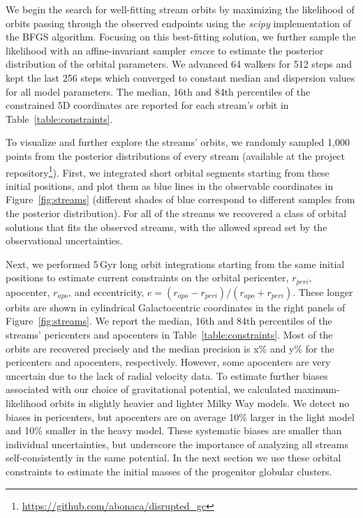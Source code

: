 \documentclass[twocolumn]{aastex63}
\newcommand{\package}[1]{\textsl{#1}}
\begin{document}
We begin the search for well-fitting stream orbits by maximizing the likelihood of orbits passing through the observed endpoints using the \package{scipy} implementation of the BFGS algorithm.
Focusing on this best-fitting solution, we further sample the likelihood with an affine-invariant sampler \package{emcee} to estimate the posterior distribution of the orbital parameters.
We advanced 64 walkers for 512 steps and kept the last 256 steps which converged to constant median and dispersion values for all model parameters.
The median, 16th and 84th percentiles of the constrained 5D coordinates are reported for each stream's orbit in Table~\ref{table:constraints}.

To visualize and further explore the streams' orbits, we randomly sampled 1,000 points from the posterior distributions of every stream (available at the project repository\footnote{\url{https://github.com/abonaca/disrupted_gc}}).
First, we integrated short orbital segments starting from these initial positions, and plot them as blue lines in the observable coordinates in Figure~\ref{fig:streams} (different shades of blue correspond to different samples from the posterior distribution).
For all of the streams we recovered a class of orbital solutions that fits the observed streams, with the allowed spread set by the observational uncertainties.

Next, we performed 5\,Gyr long orbit integrations starting from the same initial positions to estimate current constraints on the orbital pericenter, $r_{peri}$, apocenter, $r_{apo}$, and eccentricity, $e=(r_{apo} - r_{peri})/(r_{apo} + r_{peri})$.
These longer orbits are shown in cylindrical Galactocentric coordinates in the right panels of Figure~\ref{fig:streams}.
We report the median, 16th and 84th percentiles of the streams' pericenters and apocenters in Table~\ref{table:constraints}.
Most of the orbits are recovered precisely and the median precision is x\% and y\% for the pericenters and apocenters, respectively.
However, some apocenters are very uncertain due to the lack of radial velocity data.
To estimate further biases associated with our choice of gravitational potential, we calculated maximum-likelihood orbits in slightly heavier \citep[used in][]{pwb, bonaca:2019a} and lighter \citep{bovy:2015} Milky Way models.
We detect no biases in pericenters, but apocenters are on average 10\% larger in the light model and 10\% smaller in the heavy model.
These systematic biases are smaller than individual uncertainties, but underscore the importance of analyzing all streams self-consistently in the same potential.
In the next section we use these orbital constraints to estimate the initial masses of the progenitor globular clusters.
\end{document}
